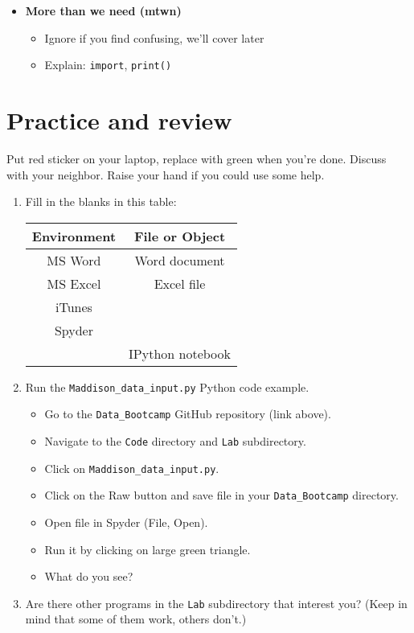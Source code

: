 \documentclass[11pt]{article}
\begin{document}
\begin{itemize}
\item {\bf More than we need (mtwn)}
\begin{itemize}
\item Ignore if you find confusing, we'll cover later
\item Explain:  {\tt import}, {\tt print()}
\end{itemize}
\end{itemize}


\section*{Practice and review}


Put red sticker on your laptop, replace with green when you're done.
Discuss with your neighbor.
Raise your hand if you could use some help.

\begin{enumerate}

\item Fill in the blanks in this table:

\begin{center}
\begin{tabular}{cc}
\toprule
Environment & File or Object \\
\midrule
MS Word  & Word document  \\
MS Excel & Excel file     \\
iTunes & \\
Spyder   &                \\
         & IPython notebook \\
\bottomrule
\end{tabular}
\end{center}


\item Run the \verb|Maddison_data_input.py| Python code example.
\begin{itemize}
\item Go to the \verb|Data_Bootcamp| GitHub repository (link above).
\item Navigate to the {\tt Code} directory and {\tt Lab} subdirectory.
\item Click on \verb|Maddison_data_input.py|.
\item Click on the Raw button and save file in your \verb|Data_Bootcamp|
directory.
\item Open file in Spyder (File, Open).
\item Run it by clicking on large green triangle.
\item What do you see?
\end{itemize}

\item Are there other programs in the {\tt Lab} subdirectory that interest you?
(Keep in mind that some of them work, others don't.) 
\end{enumerate}
\end{document}
